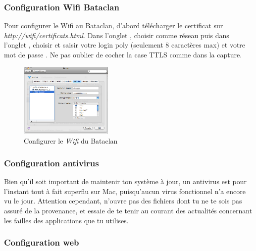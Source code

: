 
\subsubsection{Configuration Wifi Bataclan}
Pour configurer le Wifi au Bataclan, d'abord télécharger le certificat sur \emph{http://wifi/certificats.html}.
Dans l'onglet , choisir comme réseau  puis dans l'onglet , choisir  et saisir votre login poly (seulement 8 caractères max) et votre mot de passe . Ne pas oublier de cocher la case TTLS comme dans la capture.

\begin{figure}[!hl]
    \begin{center}
      \includegraphics[width=0.4\textwidth]{images/mac_config_wifi.png} 
      \caption{Configurer le \emph{Wifi} du Bataclan}
    \end{center}
  \end{figure}


\subsubsection{Configuration antivirus}

Bien qu'il soit important de maintenir ton système à jour, un antivirus est pour l'instant tout à fait superflu sur Mac, puisqu'aucun virus fonctionnel n'a encore vu le jour. Attention cependant, n'ouvre pas des fichiers dont tu ne te sois pas assuré de la provenance, et essaie de te tenir au courant des actualités concernant les failles des applications que tu utilises.


\subsubsection{Configuration web}


